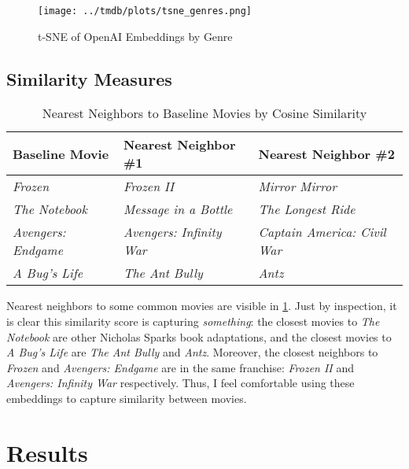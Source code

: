 \documentclass{article}
\begin{document}
\begin{figure}
    \texttt{[image: ../tmdb/plots/tsne\_genres.png]}
    \caption{t-SNE of OpenAI Embeddings by Genre}
    \label{fig:tsne}
\end{figure}


\subsection{Similarity Measures}


\begin{table}[]
    \begin{center}
        \begin{tabular}{@{}lll@{}}
        \toprule
        \textbf{Baseline Movie}    & \textbf{Nearest Neighbor \#1}   & \textbf{Nearest Neighbor \#2}       \\ \midrule
        \textit{Frozen}            & \textit{Frozen II}              & \textit{Mirror Mirror}              \\
        \textit{The Notebook}      & \textit{Message in a Bottle}    & \textit{The Longest Ride}           \\
        \textit{Avengers: Endgame} & \textit{Avengers: Infinity War} & \textit{Captain America: Civil War} \\
        \textit{A Bug's Life}      & \textit{The Ant Bully}          & \textit{Antz}                       \\ \bottomrule
        \end{tabular}
        \caption{Nearest Neighbors to Baseline Movies by Cosine Similarity}
        \label{tab:cosine}
    \end{center}
\end{table}

Nearest neighbors to some common movies are visible in \ref{tab:cosine}. Just by inspection, it is clear this similarity score is capturing \emph{something}: the closest movies to \emph{The Notebook} are other Nicholas Sparks book adaptations, and the closest movies to \emph{A Bug's Life} are \emph{The Ant Bully} and \emph{Antz}. Moreover, the closest neighbors to \emph{Frozen} and \emph{Avengers: Endgame} are in the same franchise: \emph{Frozen II} and \emph{Avengers: Infinity War} respectively. Thus, I feel comfortable using these embeddings to capture similarity between movies.

\section{Results}
\end{document}

